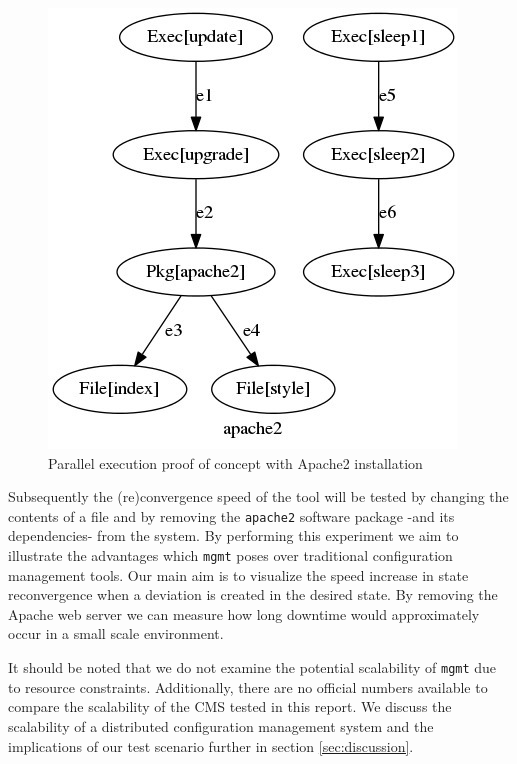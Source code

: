 \begin{figure}[!ht]
  \begin{center}
          \includegraphics[scale=0.44]{img/graph.jpeg}
          \caption{Parallel execution proof of concept with Apache2 installation}
          \label{fig:parallelexec}
  \end{center}
\end{figure}

Subsequently the (re)convergence speed of the tool will be tested by changing the contents of a file and by removing the \texttt{apache2} software package -and its dependencies- from the system. By performing this experiment we aim to illustrate the advantages which \texttt{mgmt} poses over traditional configuration management tools. Our main aim is to visualize the speed increase in state reconvergence when a deviation is created in the desired state. By removing the Apache web server we can measure how long downtime would approximately occur in a small scale environment.

\noindent
It should be noted that we do not examine the potential scalability of \texttt{mgmt} due to resource constraints. Additionally, there are no official numbers available to compare the scalability of the CMS tested in this report. We discuss the scalability of a distributed configuration management system and the implications of our test scenario further in section \ref{sec:discussion}.  
